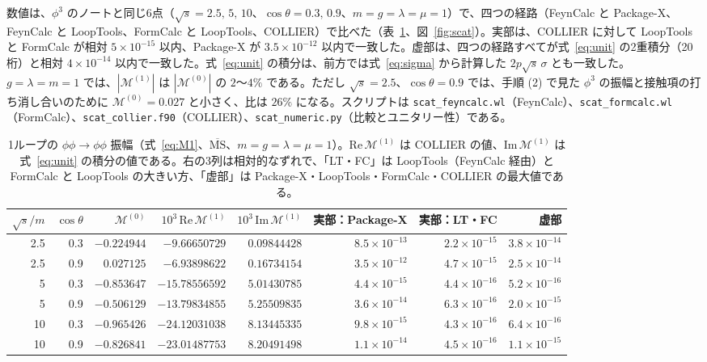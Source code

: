 \documentclass[a4paper,10pt]{ltjsarticle}
\begin{document}
数値は、$\phi^3$ のノートと同じ6点（$\sqrt s=2.5,\,5,\,10$、$\cos\theta=0.3,\,0.9$、$m=g=\lambda=\mu=1$）で、四つの経路（FeynCalc と Package-X、FeynCalc と LoopTools、FormCalc と LoopTools、COLLIER）で比べた（表~\ref{tab:scat}、図~\ref{fig:scat}）。実部は、COLLIER に対して LoopTools と FormCalc が相対 $5\times10^{-15}$ 以内、Package-X が $3.5\times10^{-12}$ 以内で一致した。虚部は、四つの経路すべてが式~\eqref{eq:unit} の2重積分（20桁）と相対 $4\times10^{-14}$ 以内で一致した。式~\eqref{eq:unit} の積分は、前方では式~\eqref{eq:sigma} から計算した $2p\sqrt s\,\sigma$ とも一致した。$g=\lambda=m=1$ では、$|\mathcal{M}^{(1)}|$ は $|\mathcal{M}^{(0)}|$ の $2$〜$4\%$ である。ただし $\sqrt s=2.5$、$\cos\theta=0.9$ では、手順 (2) で見た $\phi^3$ の振幅と接触項の打ち消し合いのために $\mathcal{M}^{(0)}=0.027$ と小さく、比は $26\%$ になる。スクリプトは \texttt{scat\_feyncalc.wl}（FeynCalc）、\texttt{scat\_formcalc.wl}（FormCalc）、\texttt{scat\_collier.f90}（COLLIER）、\texttt{scat\_numeric.py}（比較とユニタリー性）である。

\begin{table}[tbp]
\centering\small
\caption{1ループの $\phi\phi\to\phi\phi$ 振幅（式~\eqref{eq:M1}、$\overline{\mathrm{MS}}$、$m=g=\lambda=\mu=1$）。$\mathrm{Re}\,\mathcal{M}^{(1)}$ は COLLIER の値、$\mathrm{Im}\,\mathcal{M}^{(1)}$ は式~\eqref{eq:unit} の積分の値である。右の3列は相対的なずれで、「LT・FC」は LoopTools（FeynCalc 経由）と FormCalc と LoopTools の大きい方、「虚部」は Package-X・LoopTools・FormCalc・COLLIER の最大値である。}
\label{tab:scat}
\begin{tabular}{rrrrrrrr}
\toprule
$\sqrt s/m$ & $\cos\theta$ & $\mathcal{M}^{(0)}$ & $10^3\,\mathrm{Re}\,\mathcal{M}^{(1)}$ & $10^3\,\mathrm{Im}\,\mathcal{M}^{(1)}$ & 実部：Package-X & 実部：LT・FC & 虚部 \\
\midrule
2.5 & 0.3 & $-0.224944$ & $-9.66650729$ & $0.09844428$ & $8.5\times10^{-13}$ & $2.2\times10^{-15}$ & $3.8\times10^{-14}$ \\
2.5 & 0.9 & $0.027125$ & $-6.93898622$ & $0.16734154$ & $3.5\times10^{-12}$ & $4.7\times10^{-15}$ & $2.5\times10^{-14}$ \\
5 & 0.3 & $-0.853647$ & $-15.78556592$ & $5.01430785$ & $4.4\times10^{-15}$ & $4.4\times10^{-16}$ & $5.2\times10^{-16}$ \\
5 & 0.9 & $-0.506129$ & $-13.79834855$ & $5.25509835$ & $3.6\times10^{-14}$ & $6.3\times10^{-16}$ & $2.0\times10^{-15}$ \\
10 & 0.3 & $-0.965426$ & $-24.12031038$ & $8.13445335$ & $9.8\times10^{-15}$ & $4.3\times10^{-16}$ & $6.4\times10^{-16}$ \\
10 & 0.9 & $-0.826841$ & $-23.01487753$ & $8.20491498$ & $1.1\times10^{-14}$ & $4.5\times10^{-16}$ & $1.1\times10^{-15}$ \\
\bottomrule
\end{tabular}
\end{table}
\end{document}
